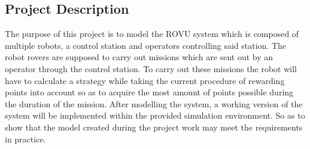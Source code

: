 \subsection*{Project Description}
The purpose of this project is to model the ROVU system which is composed of multiple robots, a control station and operators controlling said station. The robot rovers are supposed to carry out missions which are sent out by an operator through the control station. To carry out these missions the robot will have to calculate a strategy while taking the current procedure of rewarding points into account so as to acquire the most amount of points possible during the duration of the mission.\newline
After modelling the system, a working version of the system will be implemented within the provided simulation environment. So as to show that the model created during the project work may meet the requirements in practice.


